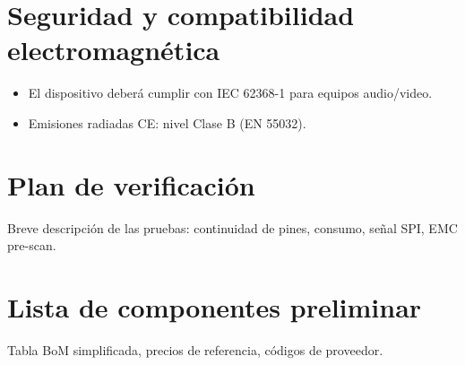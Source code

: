 \documentclass[11pt,a4paper]{article}
\begin{document}
\section{Seguridad y compatibilidad electromagnética}
\begin{itemize}
  \item El dispositivo deberá cumplir con IEC 62368-1 para equipos audio/video.
  \item Emisiones radiadas CE: nivel Clase B (EN 55032).
\end{itemize}

\section{Plan de verificación}
Breve descripción de las pruebas: continuidad de pines, consumo, señal SPI, EMC pre-scan.

\appendix
\section{Lista de componentes preliminar}
Tabla BoM simplificada, precios de referencia, códigos de proveedor.
\end{document}

